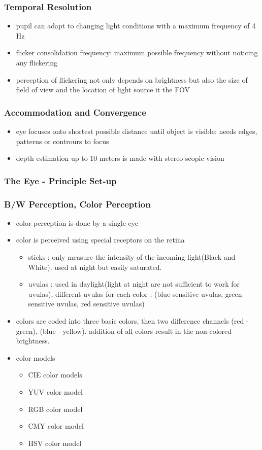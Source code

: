 \documentclass{standalone}
\begin{document}
\subsubsection{Temporal Resolution}
\begin{itemize}
	\item pupil can adapt to changing light conditions with a maximum frequency of 4 Hz	
	\item flicker consolidation frequency: maximum possible frequency without noticing any flickering
	\item perception of flickering not only depends on brightness but also the size of field of view and the location of light source it the FOV
\end{itemize}
\subsubsection{Accommodation and Convergence}
\begin{itemize}
	\item eye focuses onto shortest possible distance until object is visible: needs edges, patterns or contrours to focus
	\item depth estimation up to 10 meters is made with stereo scopic vision
\end{itemize}
\subsubsection{The Eye - Principle Set-up}
\subsubsection{B/W Perception, Color Perception}
\begin{itemize}
	\item color perception is done by a single eye
	\item color is perceived using special receptors on the retina
	\begin{itemize}
		\item sticks : only measure the intensity of the incoming light(Black and White). used at night but easily saturated.
		\item uvulas : used in daylight(light at night are not sufficient to work for uvulas), different uvulas for each color : (blue-sensitive uvulas, green-sensitive uvulas, red sensitive uvulas)
	\end{itemize}
	\item colors are coded into three basic colors, then two difference channels (red - green), (blue - yellow). addition of all colors result in the non-colored brightness.
	\item color models
	\begin{itemize}
		\item CIE color models
		\item YUV color model		
		\item RGB color model
		\item CMY color model
		\item HSV color model
	\end{itemize}
\end{itemize}
\end{document}
